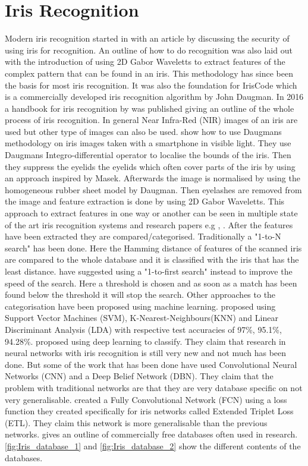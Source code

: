 \section{Iris Recognition}
\label{sec:Iris_Recognition_Research}
Modern iris recognition started in with an article by \cite{Daugman1993} discussing the security of using iris for recognition. An outline of how to do recognition was also laid out with the introduction of using  2D Gabor Waveletts to extract features of the complex pattern that can be found in an iris. This methodology has since been the basis for most iris recognition. It was also the foundation for IrisCode which is a commercially developed iris recognition algorithm by John Daugman. In 2016 a handbook for iris recognition by \cite{Bowyer2016b} was published giving an outline of the whole process of iris recognition. In general Near Infra-Red (NIR) images of an iris are used but other type of images can also be used.  \cite{Khan2017a} show how to use Daugmans methodology on iris images taken with a smartphone in visible light. They use Daugmans Integro-differential operator to localise the bounds of the iris. Then they suppress the eyelids the eyelids which often cover parts of the iris by using an approach inspired by Masek. Afterwards the image is normalised by using the homogeneous rubber sheet model by Daugman. Then eyelashes are removed from the image and feature extraction is done by using 2D Gabor Waveletts. This approach to extract features in one way or another can be seen in multiple state of the art iris recognition systems and research papers e.g \citep{Luhadiya2017a,Uka2017a,Kuehlkamp2016a}, \cite{Kuehlkamp2016a}. After the features have been extracted they are compared/categorised. Traditionally a "1-to-N search" has been done. Here the Hamming distance of features of the scanned iris are compared to the whole database and it is classified with the iris that has the least distance. \cite{Kuehlkamp2016a} have suggested using a "1-to-first search" instead to improve the speed of the search. Here a threshold is chosen and as soon as a match has been found below the threshold it will stop the search. Other approaches to the categorisation have been proposed using machine learning. \cite{Khan2017a} proposed using Support Vector Machines (SVM), K-Nearest-Neighbours(KNN) and Linear Discriminant Analysis (LDA) with respective test accuracies of 97\%, 95.1\%, 94.28\%. \cite{Zhao2017b} proposed using deep learning to classify. They claim that research in neural networks with iris recognition is still very new and not much has been done. But some of the work that has been done have used Convolutional Neural Networks (CNN) and a Deep Belief Network (DBN). They claim that the problem with traditional networks are that they are very database specific on not very generalisable. \cite{Zhao2017b} created a Fully Convolutional Network (FCN) using a loss function they created specifically for iris networks called Extended Triplet Loss (ETL). They claim this network is more generalisable than the previous networks. \cite{RifaeeMustafaandAbdallahMohammadandOkosh2017a} gives an outline of commercially free databases often used in research.\autoref{fig:Iris_database_1} and \autoref{fig:Iris_database_2} show the different contents of the databases. 

